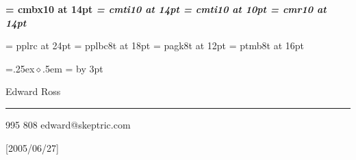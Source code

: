 \def\name{Edward Ross}
\def\addrone{}
\def\addrtwo{}
\def\phone{0403 995 808}
\def\email{edward@skeptric.com}

\font\bf = cmbx10 at 14pt
\font\it = cmti10 at 14pt
\font\smallit = cmti10 at 10pt
\font\rm = cmr10 at 14pt

\def\nameReference#1{{\it #1}}

\font\titleFont = pplrc at 24pt
\font\headFont = pplbc8t at 18pt
\font\infoFont = pagk8t at 12pt
\font\sectionFont = ptmb8t at 16pt


\parskip=0pt
\parindent=0pt

\def\head#1{\vskip2pt\hfil\headFont #1\hfill\vskip3pt}

\def\startSkill{\relax}
\def\skill#1{\rm {\vskip20pt {\sectionFont #1}}\vskip6pt}
\def\endSkill{\relax}

\def\bullet{\leavevmode\raise .25ex\hbox{$\diamond$}\kern.5em}
\newdimen\bulletSize
{}=\hbox{\bullet}
\bulletSize=
\advance\bulletSize by 3pt
\def\expTitle#1{\rm{\sectionFont #1}\par\nobreak}
\def\expRole#1#2{\vskip1pt\nobreak #2 \hfill {#1}\par\nobreak}
\def\expContent{\vskip3.5pt\nobreak\leftskip=0mm\parskip=1pt}
\def\startExp#1#2#3{\expTitle{#1}\expRole{#2}{#3}\expContent}
\def\exp#1{\hangindent=\bulletSize\hangafter=1%
\vskip1pt
\bullet #1 \par}
\def\endExp{\leftskip=0mm\parskip=0mm\vskip16pt}

\def\description#1{{\rm #1}}


\def\skilljump{\vskip2mm}


\def\pageHead{\hfil {\titleFont\name} \hfil
\vskip 3pt
\hrule
\vskip 5pt
{\infoFont\phone} \hfill {\infoFont\markupEmail{\email}}\par
\vskip 2pt}


\ifx\pdfoutput\undefined
\def\markupEmail#1{#1}
\pageHead
\else

\beginpackages
  \usepackage{url}[2005/06/27]
  \usepackage{color}
\endpackages
\enablehyperlinks
{}


